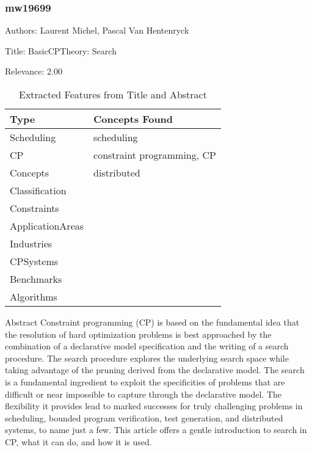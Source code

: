 \subsubsection{mw19699}
\label{mw:mw19699}

Authors: Laurent Michel, Pascal Van Hentenryck

Title: BasicCPTheory: Search

Relevance:  2.00

{\scriptsize
\begin{longtable}{p{2cm}p{20cm}}
\caption{Extracted Features from Title and Abstract}\\ \toprule
Type & Concepts Found\\ \midrule
\endhead
\bottomrule
\endfoot
Scheduling & scheduling\\ 
CP & constraint programming, CP\\ 
Concepts & distributed\\ 
Classification & \\ 
Constraints & \\ 
ApplicationAreas & \\ 
Industries & \\ 
CPSystems & \\ 
Benchmarks & \\ 
Algorithms & \\ 
\end{longtable}
}

 Abstract  Constraint programming (CP) is based on the fundamental idea that the resolution of hard optimization problems is best approached by the combination of a declarative model specification and the writing of a search procedure. The search procedure explores the underlying search space while taking advantage of the pruning derived from the declarative model. The search is a fundamental ingredient to exploit the specificities of problems that are difficult or near impossible to capture through the declarative model. The flexibility it provides lead to marked successes for truly challenging problems in scheduling, bounded program verification, test generation, and distributed systems, to name just a few. This article offers a gentle introduction to search in CP, what it can do, and how it is used. 

